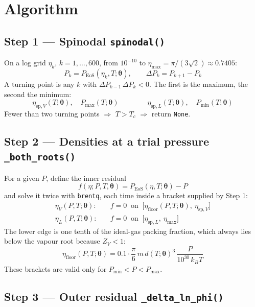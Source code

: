 \documentclass[11pt]{article}
\newcommand{\pth}{\boldsymbol{\theta}}
\newcommand{\Peos}{P_{\mathrm{EoS}}}
\newcommand{\etasv}{\eta_{\mathrm{sp},V}}
\newcommand{\etasl}{\eta_{\mathrm{sp},L}}
\begin{document}
\section{Algorithm}

\subsection*{Step 1 --- Spinodal \hfill \texttt{spinodal()}}

On a log grid $\eta_k$, $k=1,\dots,600$, from $10^{-10}$ to $\eta_{\max}=\pi/(3\sqrt2)\approx0.7405$:
\begin{equation}
P_k = \Peos(\eta_k,T;\pth), \qquad \Delta P_k = P_{k+1}-P_k
\end{equation}
A turning point is any $k$ with $\Delta P_{k-1}\,\Delta P_k<0$. The first is the maximum, the second the minimum:
\begin{equation}
\etasv(T;\pth),\quad P_{\max}(T;\pth) \qquad\qquad \etasl(T;\pth),\quad P_{\min}(T;\pth)
\end{equation}
Fewer than two turning points $\Rightarrow$ $T>T_c$ $\Rightarrow$ return \texttt{None}.

\subsection*{Step 2 --- Densities at a trial pressure \hfill \texttt{\_both\_roots()}}

For a given $P$, define the inner residual
\begin{equation}
f(\eta;P,T,\pth) = \Peos(\eta,T;\pth) - P
\end{equation}
and solve it twice with \texttt{brentq}, each time inside a bracket supplied by Step 1:
\begin{align}
\eta_V(P,T;\pth):&\quad f=0 \ \text{ on } \ \big[\eta_{\mathrm{floor}}(P,T;\pth),\ \etasv\big]\\
\eta_L(P,T;\pth):&\quad f=0 \ \text{ on } \ \big[\etasl,\ \eta_{\max}\big]
\end{align}
The lower edge is one tenth of the ideal-gas packing fraction, which always lies below the vapour root because $Z_V<1$:
\begin{equation}
\eta_{\mathrm{floor}}(P,T;\pth) = 0.1\cdot\frac{\pi}{6}\,m\,d(T;\pth)^3\,\frac{P}{10^{30}\,k_B T}
\end{equation}
These brackets are valid only for $P_{\min}<P<P_{\max}$.

\subsection*{Step 3 --- Outer residual \hfill \texttt{\_delta\_ln\_phi()}}
\end{document}
